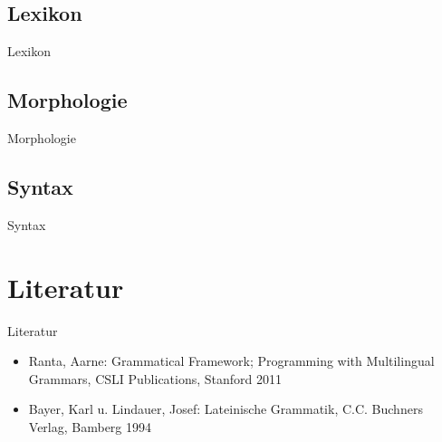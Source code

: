 \documentclass{beamer}
\begin{document}
\subsection{Lexikon}
\begin{frame}{Lexikon}
\end{frame}
\subsection{Morphologie}
\begin{frame}{Morphologie}
\end{frame}
\subsection{Syntax}
\begin{frame}{Syntax}
\end{frame}
\section{Literatur}
\begin{frame}{Literatur}
\begin{itemize}
  \item Ranta, Aarne: Grammatical Framework; Programming with Multilingual Grammars, CSLI Publications, Stanford 2011 
  \item Bayer, Karl u. Lindauer, Josef: Lateinische Grammatik, C.C. Buchners Verlag, Bamberg 1994
\end{itemize}
\end{frame}
\end{document}
